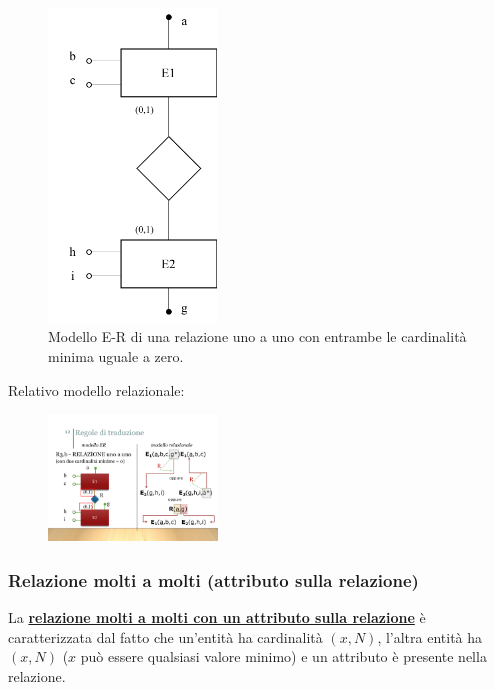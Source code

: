 \documentclass[a4paper]{article}
\begin{document}
	\begin{figure}[!htp]
		\centering
		\includegraphics[width=0.4\textwidth]{img/relazionale_uno_a_uno_card_minime_0.pdf}
		\caption{Modello E-R di una relazione uno a uno con entrambe le cardinalità minima uguale a zero.}
	\end{figure}
	
	\noindent
	Relativo modello relazionale:
	
	\begin{figure}[!htp]
		\centering
		\includegraphics[width=0.4\textwidth]{img/relazionale_uno_a_uno_card_minime_02.pdf}
	\end{figure}

	\newpage
	
	\subsubsection{Relazione molti a molti (attributo sulla relazione)}
	
	La \textcolor{Red3}{\textbf{\underline{relazione molti a molti con un attributo sulla relazione}}} è caratterizzata dal fatto che un'entità ha cardinalità $\left(x,N\right)$, l'altra entità ha $\left(x,N\right)$ ($x$ può essere qualsiasi valore minimo) e un attributo è presente nella relazione.
	
\end{document}
